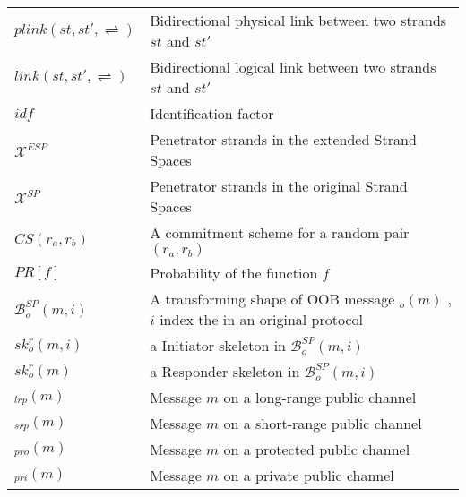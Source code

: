 \begin{longtable}[l]{p{100pt} p{250pt}}
$plink(st,st', \rightleftharpoons)$ & Bidirectional physical link between two strands $st$ and $st'$ \\
$link(st,st', \rightleftharpoons)$ & Bidirectional logical link between two strands $st$ and $st'$ \\
$idf$ & Identification factor \\
$\mathcal{X}^{ESP}$ & Penetrator strands in the extended Strand Spaces\\
$\mathcal{X}^{SP}$ &  Penetrator strands in the original Strand Spaces\\
$CS(r_a,r_b)$ & A commitment scheme for a random pair $(r_a,r_b)$ \\
$PR[f]$ & Probability of the function $f$ \\
$\mathcal{B}^{SP}_o(m,i)$ & A transforming shape of OOB message $_o(m)$ , $i$ index the in an original protocol\\
$sk^r_o(m,i)$ & a Initiator skeleton in $\mathcal{B}^{SP}_o(m,i)$ \\
$sk^r_o(m)$ & a Responder skeleton in $\mathcal{B}^{SP}_o(m,i)$ \\
$_{lrp}(m)$ & Message $m$ on a long-range public channel \\
$_{srp}(m)$ & Message $m$ on a short-range public channel \\
$_{pro}(m)$ & Message $m$ on a protected public channel \\
$_{pri}(m)$ & Message $m$ on a private public channel \\


\end{longtable}
